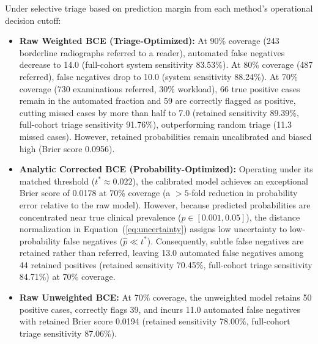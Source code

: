 \documentclass[preprint,12pt]{elsarticle}
\begin{document}
Under selective triage based on prediction margin from each method's operational decision cutoff:
\begin{itemize}
    \item \textbf{Raw Weighted BCE (Triage-Optimized):} At 90\% coverage (243 borderline radiographs referred to a reader), automated false negatives decrease to 14.0 (full-cohort system sensitivity 83.53\%). At 80\% coverage (487 referred), false negatives drop to 10.0 (system sensitivity 88.24\%). At 70\% coverage (730 examinations referred, 30\% workload), 66 true positive cases remain in the automated fraction and 59 are correctly flagged as positive, cutting missed cases by more than half to 7.0 (retained sensitivity 89.39\%, full-cohort triage sensitivity 91.76\%), outperforming random triage (11.3 missed cases). However, retained probabilities remain uncalibrated and biased high (Brier score 0.0956).
    \item \textbf{Analytic Corrected BCE (Probability-Optimized):} Operating under its matched threshold ($t^* \approx 0.022$), the calibrated model achieves an exceptional Brier score of 0.0178 at 70\% coverage (a $>5$-fold reduction in probability error relative to the raw model). However, because predicted probabilities are concentrated near true clinical prevalence ($p \in [0.001, 0.05]$), the distance normalization in Equation~(\ref{eq:uncertainty}) assigns low uncertainty to low-probability false negatives ($\hat{p} \ll t^*$). Consequently, subtle false negatives are retained rather than referred, leaving 13.0 automated false negatives among 44 retained positives (retained sensitivity 70.45\%, full-cohort triage sensitivity 84.71\%) at 70\% coverage.
    \item \textbf{Raw Unweighted BCE:} At 70\% coverage, the unweighted model retains 50 positive cases, correctly flags 39, and incurs 11.0 automated false negatives with retained Brier score 0.0194 (retained sensitivity 78.00\%, full-cohort triage sensitivity 87.06\%).
\end{itemize}
\end{document}
